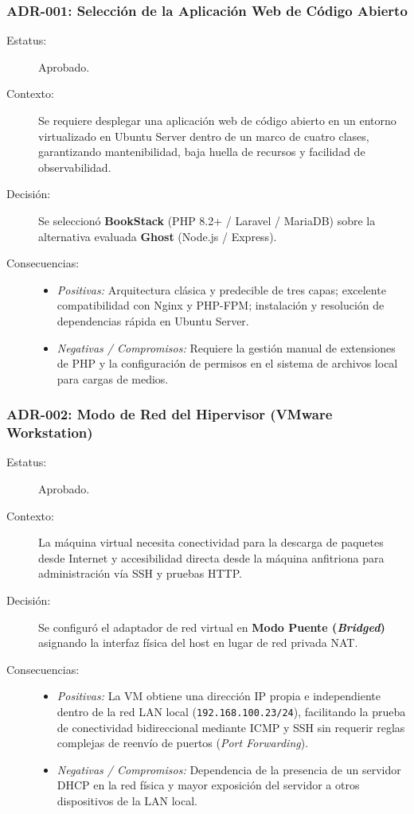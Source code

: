 \documentclass[12pt,a4paper]{article}
\begin{document}
\subsubsection{ADR-001: Selección de la Aplicación Web de Código Abierto}
\begin{description}
    \item[Estatus:] Aprobado.
    \item[Contexto:] Se requiere desplegar una aplicación web de código abierto en un entorno virtualizado en Ubuntu Server dentro de un marco de cuatro clases, garantizando mantenibilidad, baja huella de recursos y facilidad de observabilidad.
    \item[Decisión:] Se seleccionó \textbf{BookStack} (PHP 8.2+ / Laravel / MariaDB) sobre la alternativa evaluada \textbf{Ghost} (Node.js / Express).
    \item[Consecuencias:] 
    \begin{itemize}
        \item \textit{Positivas:} Arquitectura clásica y predecible de tres capas; excelente compatibilidad con Nginx y PHP-FPM; instalación y resolución de dependencias rápida en Ubuntu Server.
        \item \textit{Negativas / Compromisos:} Requiere la gestión manual de extensiones de PHP y la configuración de permisos en el sistema de archivos local para cargas de medios.
    \end{itemize}
\end{description}

\subsubsection{ADR-002: Modo de Red del Hipervisor (VMware Workstation)}
\begin{description}
    \item[Estatus:] Aprobado.
    \item[Contexto:] La máquina virtual necesita conectividad para la descarga de paquetes desde Internet y accesibilidad directa desde la máquina anfitriona para administración vía SSH y pruebas HTTP.
    \item[Decisión:] Se configuró el adaptador de red virtual en \textbf{Modo Puente (\textit{Bridged})} asignando la interfaz física del host en lugar de red privada NAT.
    \item[Consecuencias:] 
    \begin{itemize}
        \item \textit{Positivas:} La VM obtiene una dirección IP propia e independiente dentro de la red LAN local (\texttt{192.168.100.23/24}), facilitando la prueba de conectividad bidireccional mediante ICMP y SSH sin requerir reglas complejas de reenvío de puertos (\textit{Port Forwarding}).
        \item \textit{Negativas / Compromisos:} Dependencia de la presencia de un servidor DHCP en la red física y mayor exposición del servidor a otros dispositivos de la LAN local.
    \end{itemize}
\end{description}
\end{document}
